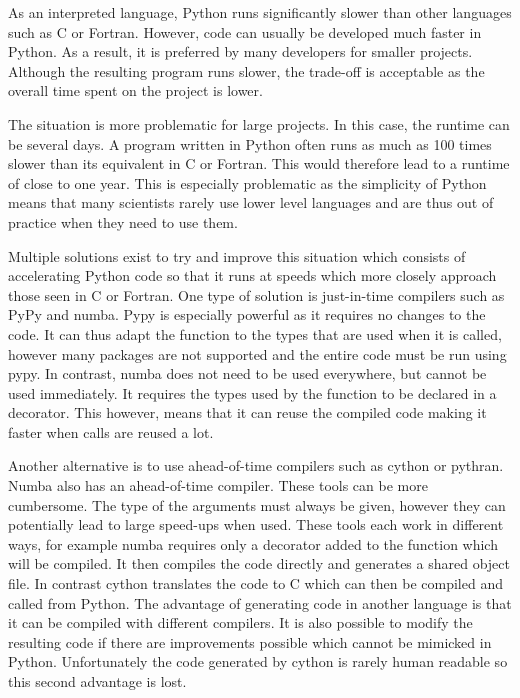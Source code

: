 
As an interpreted language, Python runs significantly slower than other languages such as C or Fortran. However, code can usually be developed much faster in Python. As a result, it is preferred by many developers for smaller projects. Although the resulting program runs slower, the trade-off is acceptable as the overall time spent on the project is lower.

The situation is more problematic for large projects. In this case, the runtime can be several days. A program written in Python often runs as much as 100 times slower than its equivalent in C or Fortran. This would therefore lead to a runtime of close to one year. This is especially problematic as the simplicity of Python means that many scientists rarely use lower level languages and are thus out of practice when they need to use them.

Multiple solutions exist to try and improve this situation which consists of accelerating Python code so that it runs at speeds which more closely approach those seen in C or Fortran. One type of solution is just-in-time compilers such as PyPy and numba. Pypy is especially powerful as it requires no changes to the code. It can thus adapt the function to the types that are used when it is called, however many packages are not supported and the entire code must be run using pypy. In contrast, numba does not need to be used everywhere, but cannot be used immediately. It requires the types used by the function to be declared in a decorator. This however, means that it can reuse the compiled code making it faster when calls are reused a lot.

Another alternative is to use ahead-of-time compilers such as cython or pythran. Numba also has an ahead-of-time compiler. These tools can be more cumbersome. The type of the arguments must always be given, however they can potentially lead to large speed-ups when used. These tools each work in different ways, for example numba requires only a decorator added to the function which will be compiled. It then compiles the code directly and generates a shared object file. In contrast cython translates the code to C which can then be compiled and called from Python. The advantage of generating code in another language is that it can be compiled with different compilers. It is also possible to modify the resulting code if there are improvements possible which cannot be mimicked in Python. Unfortunately the code generated by cython is rarely human readable so this second advantage is lost.


